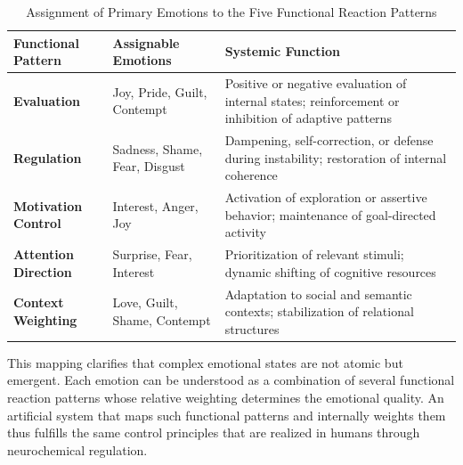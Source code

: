 \begin{table}[H]
\renewcommand{\arraystretch}{1.5}
\centering
\begin{tabular}{L{3cm}|L{6cm}|L{6cm}}
\textbf{Functional Pattern} & \textbf{Assignable Emotions} & \textbf{Systemic Function} \\
\hline
\textbf{Evaluation} & Joy, Pride, Guilt, Contempt & Positive or negative evaluation of internal states; reinforcement or inhibition of adaptive patterns \\
\textbf{Regulation} & Sadness, Shame, Fear, Disgust & Dampening, self-correction, or defense during instability; restoration of internal coherence \\
\textbf{Motivation Control} & Interest, Anger, Joy & Activation of exploration or assertive behavior; maintenance of goal-directed activity \\
\textbf{Attention Direction} & Surprise, Fear, Interest & Prioritization of relevant stimuli; dynamic shifting of cognitive resources \\
\textbf{Context Weighting} & Love, Guilt, Shame, Contempt & Adaptation to social and semantic contexts; stabilization of relational structures \\
\end{tabular}
\caption{Assignment of Primary Emotions to the Five Functional Reaction Patterns}
\label{tab:emotion_funktional}
\end{table}

\begin{reflexion}
This mapping clarifies that complex emotional states are not atomic but emergent. Each emotion can be understood as a combination of several functional reaction patterns whose relative weighting determines the emotional quality. An artificial system that maps such functional patterns and internally weights them thus fulfills the same control principles that are realized in humans through neurochemical regulation.
\end{reflexion}



